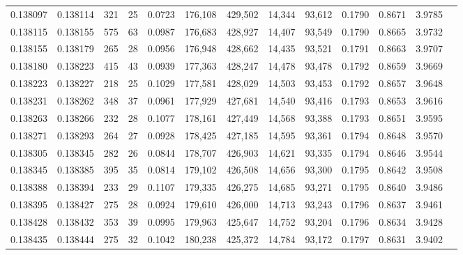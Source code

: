 \begin{tabular}{rrrrrrrrrrrrr}
0.138097 & 0.138114 &   321 &  25 &                                     0.0723 & 176,108 & 429,502 &  14,344 &  93,612 & 0.1790 & 0.8671 & 3.9785 \\
0.138115 & 0.138155 &   575 &  63 &                                     0.0987 & 176,683 & 428,927 &  14,407 &  93,549 & 0.1790 & 0.8665 & 3.9732 \\
0.138155 & 0.138179 &   265 &  28 &                                     0.0956 & 176,948 & 428,662 &  14,435 &  93,521 & 0.1791 & 0.8663 & 3.9707 \\
0.138180 & 0.138223 &   415 &  43 &                                     0.0939 & 177,363 & 428,247 &  14,478 &  93,478 & 0.1792 & 0.8659 & 3.9669 \\
0.138223 & 0.138227 &   218 &  25 &                                     0.1029 & 177,581 & 428,029 &  14,503 &  93,453 & 0.1792 & 0.8657 & 3.9648 \\
0.138231 & 0.138262 &   348 &  37 &                                     0.0961 & 177,929 & 427,681 &  14,540 &  93,416 & 0.1793 & 0.8653 & 3.9616 \\
0.138263 & 0.138266 &   232 &  28 &                                     0.1077 & 178,161 & 427,449 &  14,568 &  93,388 & 0.1793 & 0.8651 & 3.9595 \\
0.138271 & 0.138293 &   264 &  27 &                                     0.0928 & 178,425 & 427,185 &  14,595 &  93,361 & 0.1794 & 0.8648 & 3.9570 \\
0.138305 & 0.138345 &   282 &  26 &                                     0.0844 & 178,707 & 426,903 &  14,621 &  93,335 & 0.1794 & 0.8646 & 3.9544 \\
0.138345 & 0.138385 &   395 &  35 &                                     0.0814 & 179,102 & 426,508 &  14,656 &  93,300 & 0.1795 & 0.8642 & 3.9508 \\
0.138388 & 0.138394 &   233 &  29 &                                     0.1107 & 179,335 & 426,275 &  14,685 &  93,271 & 0.1795 & 0.8640 & 3.9486 \\
0.138395 & 0.138427 &   275 &  28 &                                     0.0924 & 179,610 & 426,000 &  14,713 &  93,243 & 0.1796 & 0.8637 & 3.9461 \\
0.138428 & 0.138432 &   353 &  39 &                                     0.0995 & 179,963 & 425,647 &  14,752 &  93,204 & 0.1796 & 0.8634 & 3.9428 \\
0.138435 & 0.138444 &   275 &  32 &                                     0.1042 & 180,238 & 425,372 &  14,784 &  93,172 & 0.1797 & 0.8631 & 3.9402 \\

\end{tabular}
